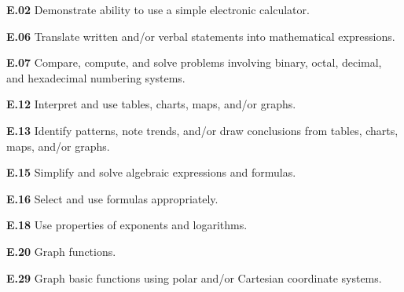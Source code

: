 \item{\bf E.02} Demonstrate ability to use a simple electronic calculator.
\item{\bf E.06} Translate written and/or verbal statements into mathematical expressions.
\item{\bf E.07} Compare, compute, and solve problems involving binary, octal, decimal, and hexadecimal numbering systems.
\item{\bf E.12} Interpret and use tables, charts, maps, and/or graphs.
\item{\bf E.13} Identify patterns, note trends, and/or draw conclusions from tables, charts, maps, and/or graphs.
\item{\bf E.15} Simplify and solve algebraic expressions and formulas.
\item{\bf E.16} Select and use formulas appropriately.
\item{\bf E.18} Use properties of exponents and logarithms.
\item{\bf E.20} Graph functions.
\item{\bf E.29} Graph basic functions using polar and/or Cartesian coordinate systems.
\medskip


